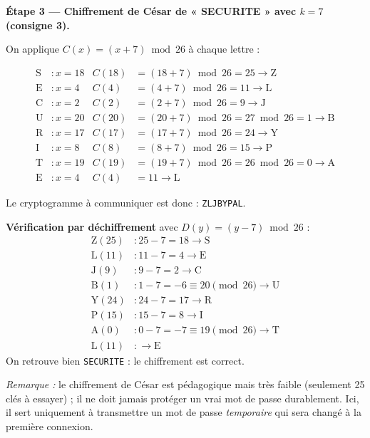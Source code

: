 \documentclass[11pt]{article}
\begin{document}
\begin{exoresolu}
\textbf{Étape 3 — Chiffrement de César de « SECURITE » avec $k = 7$ (consigne 3).}

On applique $C(x) = (x + 7) \bmod 26$ à chaque lettre :

\begin{align*}
\text{S} &: x = 18 & C(18) &= (18+7) \bmod 26 = 25 \rightarrow \text{Z}\\
\text{E} &: x = 4  & C(4)  &= (4+7) \bmod 26 = 11 \rightarrow \text{L}\\
\text{C} &: x = 2  & C(2)  &= (2+7) \bmod 26 = 9 \rightarrow \text{J}\\
\text{U} &: x = 20 & C(20) &= (20+7) \bmod 26 = 27 \bmod 26 = 1 \rightarrow \text{B}\\
\text{R} &: x = 17 & C(17) &= (17+7) \bmod 26 = 24 \rightarrow \text{Y}\\
\text{I} &: x = 8  & C(8)  &= (8+7) \bmod 26 = 15 \rightarrow \text{P}\\
\text{T} &: x = 19 & C(19) &= (19+7) \bmod 26 = 26 \bmod 26 = 0 \rightarrow \text{A}\\
\text{E} &: x = 4  & C(4)  &= 11 \rightarrow \text{L}
\end{align*}

Le cryptogramme à communiquer est donc : \texttt{ZLJBYPAL}.

\textbf{Vérification par déchiffrement} avec $D(y) = (y - 7) \bmod 26$ :
\begin{align*}
\text{Z} (25) &: 25-7=18 \rightarrow \text{S} \\
\text{L} (11) &: 11-7=4 \rightarrow \text{E} \\
\text{J} (9)  &: 9-7=2 \rightarrow \text{C} \\
\text{B} (1)  &: 1-7=-6 \equiv 20 \pmod{26} \rightarrow \text{U} \\
\text{Y} (24) &: 24-7=17 \rightarrow \text{R} \\
\text{P} (15) &: 15-7=8 \rightarrow \text{I} \\
\text{A} (0)  &: 0-7=-7 \equiv 19 \pmod{26} \rightarrow \text{T} \\
\text{L} (11) &: \rightarrow \text{E}
\end{align*}
On retrouve bien \texttt{SECURITE} : le chiffrement est correct.

\emph{Remarque :} le chiffrement de César est pédagogique mais très faible (seulement 25 clés à essayer) ; il ne doit jamais protéger un vrai mot de passe durablement. Ici, il sert uniquement à transmettre un mot de passe \emph{temporaire} qui sera changé à la première connexion.


\end{exoresolu}
\end{document}
